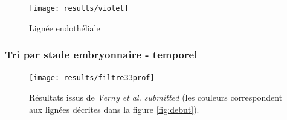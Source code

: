 \documentclass[fleqn,11pt]{SelfArx} %
\begin{document}
\begin{figure}[ht]
\centering
\texttt{[image: results/violet]}
\caption{Lignée endothéliale}
\label{fig:4SFG}
\end{figure}

\subsubsection{Tri par stade embryonnaire -  temporel}
%



\begin{figure}[ht]
\centering
\texttt{[image: results/filtre33prof]}
\caption{Résultats issus de \textit{Verny et al. submitted} (les couleurs correspondent aux lignées décrites dans la figure \ref{fig:debut}).}
\label{fig:filtre33prof}
\end{figure}
\end{document}
